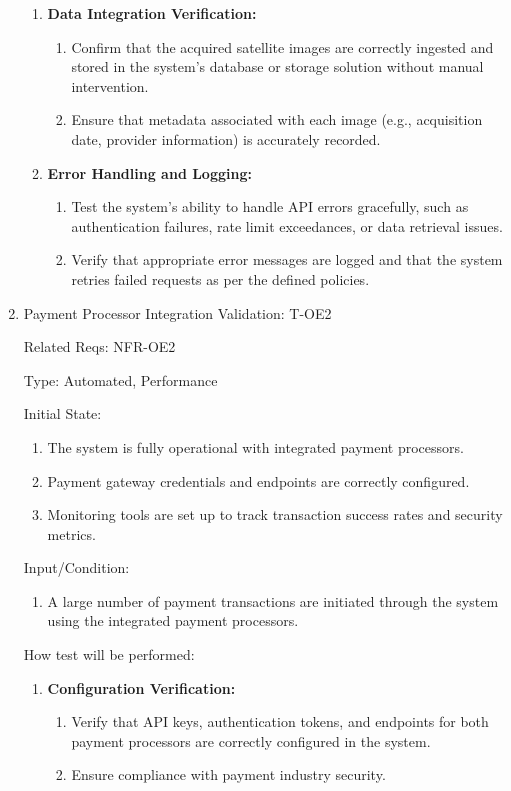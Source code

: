 \documentclass[12pt, titlepage]{article}
\begin{document}
\begin{enumerate}
\begin{enumerate}
    \item \textbf{Data Integration Verification:}
    \begin{enumerate}
        \item Confirm that the acquired satellite images are correctly ingested and stored in the system’s database or storage solution without manual intervention.
        \item Ensure that metadata associated with each image (e.g., acquisition date, provider information) is accurately recorded.
    \end{enumerate}
    
    \item \textbf{Error Handling and Logging:}
    \begin{enumerate}
        \item Test the system’s ability to handle API errors gracefully, such as authentication failures, rate limit exceedances, or data retrieval issues.
        \item Verify that appropriate error messages are logged and that the system retries failed requests as per the defined policies.
    \end{enumerate}
    
\end{enumerate}


\item{Payment Processor Integration Validation: T-OE2\\}

Related Reqs: NFR-OE2

Type: Automated, Performance

Initial State:
\begin{enumerate}
    \item The system is fully operational with integrated payment processors.
    \item Payment gateway credentials and endpoints are correctly configured.
    \item Monitoring tools are set up to track transaction success rates and security metrics.
\end{enumerate}
Input/Condition:
\begin{enumerate}
    \item A large number of payment transactions are initiated through the system using the integrated payment processors.
\end{enumerate}
How test will be performed:
\begin{enumerate}
    \item \textbf{Configuration Verification:}
    \begin{enumerate}
        \item Verify that API keys, authentication tokens, and endpoints for both payment processors are correctly configured in the system.
        \item Ensure compliance with payment industry security.
    \end{enumerate}
    

\end{enumerate}
\end{enumerate}
\end{document}
